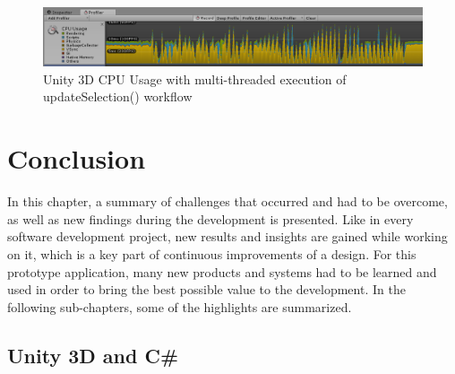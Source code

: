 \begin{figure}[h]
	\begin{center}
		\includegraphics[width=14cm]{03_Figures/08_Development/CPU_Usage_Multithreaded.png}
		\caption{Unity 3D CPU Usage with multi-threaded execution of updateSelection() workflow}
		\label{fig:unityprofilemulti}
	\end{center}
\end{figure}



\section{Conclusion}

In this chapter, a summary of challenges that occurred and had to be overcome, as well as new findings during the development is presented. Like in every software development project, new results and insights are gained while working on it, which is a key part of continuous improvements of a design. For this prototype application, many new products and systems had to be learned and used in order to bring the best possible value to the development. In the following sub-chapters, some of the highlights are summarized.


\subsection{Unity 3D and C\#}

